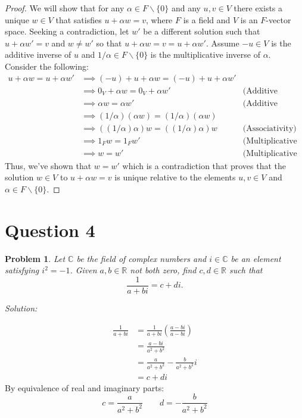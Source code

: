 \documentclass[12pt, letterpaper]{article}
\newenvironment{sol}
    {\emph{Solution:}
    }
    {
    }
\theoremstyle{plain}
\newtheorem{prob}[theorem]{Problem}
\theoremstyle{definition}
\theoremstyle{remark}
\begin{document}
\begin{proof}
We will show that for any $\alpha\in F\backslash \{0\}$ and any $u,v\in V$ there exists a unique $w\in V$ that satisfies $u+\alpha w=v$, where $F$ is a field and $V$ is an $F$-vector space. Seeking a contradiction, let $w'$ be a different solution such that $u+\alpha w'=v$ and $w\ne w'$ so that $u+\alpha w=v=u+\alpha w'$. Assume $-u\in V$ is the additive inverse of $u$ and $1/\alpha \in F\backslash \{0\}$ is the multiplicative inverse of $\alpha$. Consider the following:
\begin{align*}
    u+\alpha w=u+\alpha w' &\implies (-u)+u+\alpha w=(-u)+u+\alpha w' \\
                           &\implies 0_V+\alpha w=0_V+\alpha w' &\text{(Additive Inverse)} \\
                           &\implies \alpha w=\alpha w' &\text{(Additive Identity)} \\
                           &\implies (1/\alpha)(\alpha w)=(1/\alpha)(\alpha w) \\
                           &\implies ((1/\alpha)\alpha) w=((1/\alpha)\alpha) w &\text{(Associativity)} \\
                           &\implies 1_Fw=1_Fw' &\text{(Multiplicative Inverse)} \\
                           &\implies w=w' &\text{(Multiplicative Identity)}
\end{align*}
Thus, we've shown that $w=w'$ which is a contradiction that proves that the solution $w\in V$ to $u+\alpha w=v$ is unique relative to the elements $u,v\in V$ and $\alpha \in F\backslash\{0\}$. 
\end{proof}


\section{Question 4} %

\begin{prob}
	Let $\mathbb{C}$ be the field of complex numbers and $i\in\mathbb{C}$ be an element satisfying $i^2=-1$. Given $a,b\in\mathbb{R}$ not both zero, find $c,d\in\mathbb{R}$ such that $$\frac1{a+bi}=c+di.$$
\end{prob}

\begin{sol}
	\begin{align*}
		\frac1{a+bi} &= \frac1{a+bi}\left(\frac{a-bi}{a-bi}\right) \\
			     &= \frac{a-bi}{a^2+b^2} \\
			     &= \frac a{a^2+b^2}-\frac b{a^2+b^2}i \\
              &= c+di
	\end{align*}
 By equivalence of real and imaginary parts:
	$$c=\frac a{a^2+b^2}\qquad d=-\frac b{a^2+b^2}$$
\end{sol}
\end{document}
